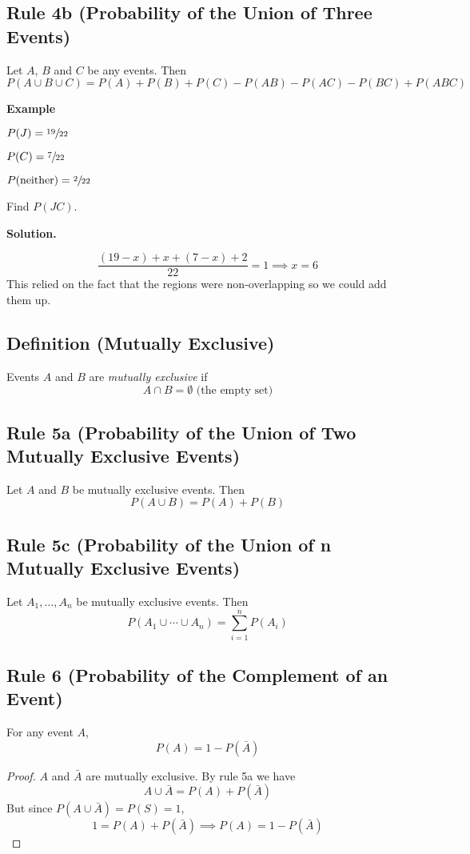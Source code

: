 \begin{thmbox}
    \subsection{Rule 4b (Probability of the Union of Three Events)}
    Let $ A $, $ B $ and $ C $ be any events. Then
    \[ P(A\cup B\cup C)=P(A)+P(B)+P(C)-P(AB)-P(AC)-P(BC)+P(ABC) \]
\end{thmbox}

\textbf{Example}

$ P(J)=\sfrac{19}{22}  $

$ P(C)=\sfrac{7}{22} $

$ P(\text{neither})=\sfrac{2}{22}  $

Find $ P(JC) $.

\textbf{Solution.}

\[ \frac{(19-x)+x+(7-x)+2}{22}=1\implies x=6 \]
This relied on the fact that the regions were non-overlapping so we could add
them up.

\begin{defbox}
    \subsection{Definition (Mutually Exclusive)}
    Events $ A $ and $ B $ are \emph{mutually exclusive} if
    \[ A\cap B=\emptyset \text{ (the empty set)} \]
\end{defbox}

\begin{thmbox}
    \subsection{Rule 5a (Probability of the Union of Two Mutually Exclusive Events)}
    Let $ A $ and $ B $ be mutually exclusive events. Then
    \[ P(A\cup B)=P(A)+P(B) \]
\end{thmbox}

\begin{thmbox}
    \subsection{Rule 5c (Probability of the Union of n Mutually Exclusive Events)}
    Let $ A_1,\ldots ,A_n $ be mutually exclusive events. Then
    \[ P(A_1\cup \cdots \cup A_n)=\sum\limits_{i=1}^{n} P(A_i) \]
\end{thmbox}

\begin{thmbox}
    \subsection{Rule 6 (Probability of the Complement of an Event)}
    For any event $ A $,
    \[ P(A)=1-P(\bar{A}) \]
\end{thmbox}
\begin{proof}
    $ A $ and $ \bar{A} $ are mutually exclusive. By rule 5a we have
    \[ A\cup \bar{A}=P(A)+P(\bar{A}) \]
    But since $ P(A\cup \bar{A})=P(S)=1 $,
    \[ 1=P(A)+P(\bar{A})\implies P(A)=1-P(\bar{A}) \]
\end{proof}

